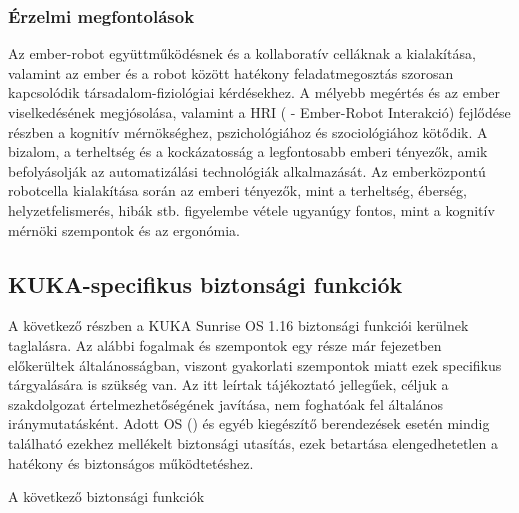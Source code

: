 \documentclass[../documentation.tex]{subfiles}
\begin{document}
\subsubsection{Érzelmi megfontolások}
Az ember-robot együttműködésnek és a kollaboratív celláknak a kialakítása, valamint az ember és a robot között hatékony feladatmegosztás szorosan kapcsolódik társadalom-fiziológiai kérdésekhez. A mélyebb megértés és az ember viselkedésének megjósolása, valamint a HRI ( - Ember-Robot Interakció) fejlődése részben a kognitív mérnökséghez, pszichológiához és szociológiához kötődik. A bizalom, a terheltség és a kockázatosság a legfontosabb emberi tényezők, amik befolyásolják az automatizálási technológiák alkalmazását. Az emberközpontú robotcella kialakítása során az emberi tényezők, mint a terheltség, éberség, helyzetfelismerés, hibák stb. figyelembe vétele ugyanúgy fontos, mint a kognitív mérnöki szempontok és az ergonómia\cite{humanfactors}.

\subsection{KUKA-specifikus biztonsági funkciók}
A következő részben a KUKA Sunrise OS 1.16 biztonsági funkciói kerülnek taglalásra. Az alábbi fogalmak és szempontok egy része már  fejezetben előkerültek általánosságban, viszont gyakorlati szempontok miatt ezek specifikus tárgyalására is szükség van. Az itt leírtak tájékoztató jellegűek, céljuk a szakdolgozat értelmezhetőségének javítása, nem foghatóak fel általános iránymutatásként. Adott OS () és egyéb kiegészítő berendezések esetén mindig található ezekhez mellékelt biztonsági utasítás, ezek betartása elengedhetetlen a hatékony és biztonságos működtetéshez.

A következő biztonsági funkciók
\end{document}
